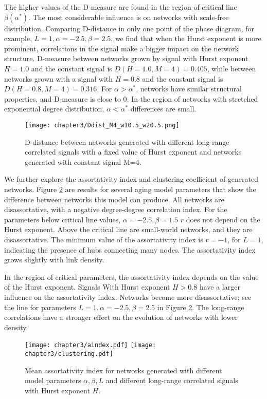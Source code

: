 The higher values of the D-measure are found in the region of critical line $\beta(\alpha^{*})$. The most considerable influence is on networks with scale-free distribution. Comparing D-distance in only one point of the phase diagram, for example, $L=1, \alpha = -2.5, \beta = 2.5$, we find that when the Hurst exponent is more prominent, correlations in the signal make a bigger impact on the network structure. D-measure between networks grown by signal with Hurst exponent $H=1.0$ and the constant signal is $D(H=1.0, M=4) = 0.405$, while between networks grown with a signal with $H=0.8$ and the constant signal is $D(H=0.8, M=4) = 0.316$. For $\alpha>\alpha^{*}$, networks have similar structural properties, and D-measure is close to 0. In the region of networks with stretched exponential degree distribution, $\alpha<\alpha^{*}$  differences are small. 

\begin{figure}[H]
	\centering
	\texttt{[image: chapter3/Ddist\_M4\_w10.5\_w20.5.png]}
	\caption[D-distance for networks generated with monofractal signals.]{D-distance between networks generated with different long-range correlated signals with a fixed value of Hurst exponent and networks generated with constant signal M=4.}
	\label{fig:Ddist_m}
\end{figure}

We further explore the assortativity index and clustering coefficient of generated networks. Figure \ref{fig:aindex} are results for several aging model parameters that show the difference between networks this model can produce. All networks are disassortative, with a negative degree-degree correlation index. For the parameters below critical line values, $\alpha=-2.5, \beta=1.5$ $r$ does not depend on the Hurst exponent. Above the critical line are small-world networks, and they are disassortative. The minimum value of the assortativity index is $r =-1$, for $L=1$, indicating the presence of hubs connecting many nodes. The assortativity index grows slightly with link density. 

In the region of critical parameters, the assortativity index depends on the value of the Hurst exponent. Signals With Hurst exponent $H>0.8$ have a larger influence on the assortativity index. Networks become more disassortative; see the line for parameters $L=1, \alpha=-2.5, \beta=2.5$ in Figure \ref{fig:aindex}. The long-range correlations have a stronger effect on the evolution of networks with lower density. 

\begin{figure}[h!]
	\centering
	\texttt{[image: chapter3/aindex.pdf]}
	\texttt{[image: chapter3/clustering.pdf]}
	\caption[Assortativity index and mean clustering coefficient.]{Mean assortativity index for networks generated  with different model parameters $\alpha, \beta, L$ and different long-range correlated signals with Hurst exponent $H$.}
	\label{fig:aindex}
\end{figure} 

